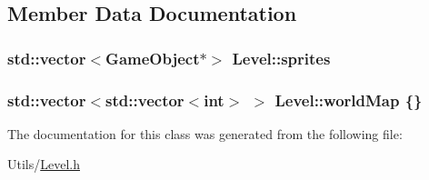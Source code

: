 \subsection{Member Data Documentation}
\hypertarget{classLevel_a241c89cec38f89b1ea325fcad5a10184}{
\subsubsection[{sprites}]{\setlength{\rightskip}{0pt plus 5cm}std\-::vector$<${\bf Game\-Object}$\ast$$>$ Level\-::sprites}}\label{classLevel_a241c89cec38f89b1ea325fcad5a10184}
\hypertarget{classLevel_a3f00360834114363d32e0859b3c1aa6b}{
\subsubsection[{world\-Map}]{\setlength{\rightskip}{0pt plus 5cm}std\-::vector$<$std\-::vector$<$int$>$ $>$ Level\-::world\-Map \{\}}}\label{classLevel_a3f00360834114363d32e0859b3c1aa6b}


The documentation for this class was generated from the following file\-:\begin{DoxyCompactItemize}
\item 
Utils/\hyperlink{Level_8h}{Level.\-h}\end{DoxyCompactItemize}
